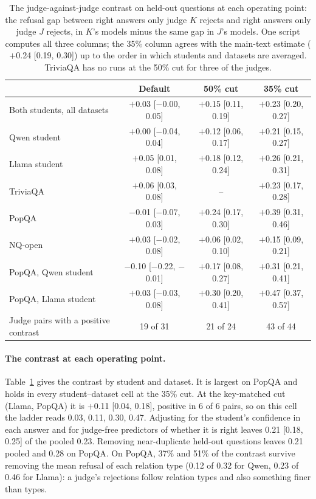 \documentclass[11pt,a4paper,twocolumn]{article}
\begin{document}
\begin{table}[t]
\small
\centering
\setlength{\tabcolsep}{8pt}
\begin{tabular}{@{}lccc@{}}
\toprule
 & Default & 50\% cut & 35\% cut \\
\midrule
Both students, all datasets & $+$0.03 [$-$0.00, 0.05] & $+$0.15 [0.11, 0.19] & $+$0.23 [0.20, 0.27] \\
Qwen student & $+$0.00 [$-$0.04, 0.04] & $+$0.12 [0.06, 0.17] & $+$0.21 [0.15, 0.27] \\
Llama student & $+$0.05 [0.01, 0.08] & $+$0.18 [0.12, 0.24] & $+$0.26 [0.21, 0.31] \\
TriviaQA & $+$0.06 [0.03, 0.08] & -- & $+$0.23 [0.17, 0.28] \\
PopQA & $-$0.01 [$-$0.07, 0.03] & $+$0.24 [0.17, 0.30] & $+$0.39 [0.31, 0.46] \\
NQ-open & $+$0.03 [$-$0.02, 0.08] & $+$0.06 [0.02, 0.10] & $+$0.15 [0.09, 0.21] \\
PopQA, Qwen student & $-$0.10 [$-$0.22, $-$0.01] & $+$0.17 [0.08, 0.27] & $+$0.31 [0.21, 0.41] \\
PopQA, Llama student & $+$0.03 [$-$0.03, 0.08] & $+$0.30 [0.20, 0.41] & $+$0.47 [0.37, 0.57] \\
\midrule
Judge pairs with a positive contrast & 19 of 31 & 21 of 24 & 43 of 44 \\
\bottomrule
\end{tabular}
\caption{The judge-against-judge contrast on held-out questions at each operating point: the refusal gap between right answers only judge $K$ rejects and right answers only judge $J$ rejects, in $K$'s models minus the same gap in $J$'s models. One script computes all three columns; the 35\% column agrees with the main-text estimate ($+$0.24 [0.19, 0.30]) up to the order in which students and datasets are averaged. TriviaQA has no runs at the 50\% cut for three of the judges.}
\label{tab:contrast}
\end{table}

\paragraph{The contrast at each operating point.} Table~\ref{tab:contrast} gives the contrast by student and dataset. It is largest on PopQA and holds in every student--dataset cell at the 35\% cut. At the key-matched cut (Llama, PopQA) it is $+$0.11 [0.04, 0.18], positive in 6 of 6 pairs, so on this cell the ladder reads 0.03, 0.11, 0.30, 0.47. Adjusting for the student's confidence in each answer and for judge-free predictors of whether it is right leaves 0.21 [0.18, 0.25] of the pooled 0.23. Removing near-duplicate held-out questions leaves 0.21 pooled and 0.28 on PopQA. On PopQA, 37\% and 51\% of the contrast survive removing the mean refusal of each relation type (0.12 of 0.32 for Qwen, 0.23 of 0.46 for Llama): a judge's rejections follow relation types and also something finer than types.
\end{document}
